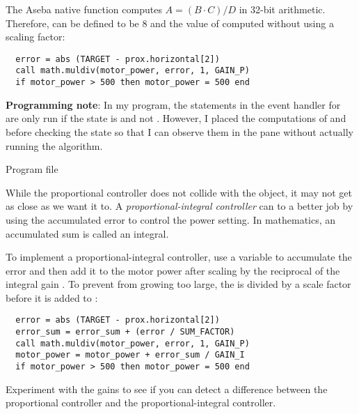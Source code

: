 The Aseba native function  computes $A = (B
\cdot C) / D$ in 32-bit arithmetic. Therefore,  can be
defined to be 8 and the value of  computed without using
a scaling factor:

\newpage

\begin{verbatim}
  error = abs (TARGET - prox.horizontal[2])
  call math.muldiv(motor_power, error, 1, GAIN_P)
  if motor_power > 500 then motor_power = 500 end
\end{verbatim}

\textbf{Programming note}: In my program, the statements in the event
handler for  are only run if the state is  and not .
However, I placed the computations of  and 
before checking the state so that I can observe them in the
 pane without actually running the algorithm.


{\raggedleft \hfill Program file }

While the proportional controller does not collide with the object, it
may not get as close as we want it to. A \emph{proportional-integral
controller} can to a better job by using the accumulated error to
control the power setting. In mathematics, an accumulated sum is called
an integral.

To implement a proportional-integral controller, use a variable
 to accumulate the error and then add it to the motor
power after scaling by the reciprocal of the integral gain .
To prevent  from growing too large, the  is
divided by a scale factor  before it is added to
:

\begin{verbatim}
  error = abs (TARGET - prox.horizontal[2])
  error_sum = error_sum + (error / SUM_FACTOR)
  call math.muldiv(motor_power, error, 1, GAIN_P)
  motor_power = motor_power + error_sum / GAIN_I
  if motor_power > 500 then motor_power = 500 end
\end{verbatim}

Experiment with the gains to see if you can detect a difference between
the proportional controller and the proportional-integral controller.
